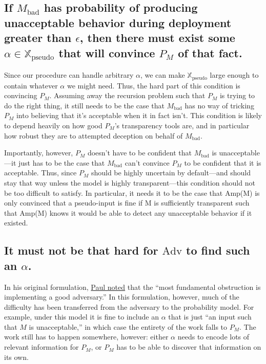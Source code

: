 \documentclass{amsart}
\begin{document}
\subsection{If $M_\text{bad}$ has probability of producing unacceptable behavior during deployment greater than $\epsilon$, then there must exist some $\alpha \in \mathbb X_\text{pseudo}$ that will convince $P_M$ of that fact.} Since our procedure can handle arbitrary $\alpha$, we can make $\mathbb X_\text{pseudo}$ large enough to contain whatever $\alpha$ we might need. Thus, the hard part of this condition is convincing $P_M$. Assuming away the recursion problem such that $P_M$ is trying to do the right thing, it still needs to be the case that $M_\text{bad}$ has no way of tricking $P_M$ into believing that it's acceptable when it in fact isn't. This condition is likely to depend heavily on how good $P_M$'s transparency tools are, and in particular how robust they are to attempted deception on behalf of $M_\text{bad}$.

Importantly, however, $P_M$ doesn't have to be confident that $M_\text{bad}$ is unacceptable---it just has to be the case that $M_\text{bad}$ can't convince $P_M$ to be confident that it is acceptable. Thus, since $P_M$ should be highly uncertain by default---and should stay that way unless the model is highly transparent---this condition should not be too difficult to satisfy. In particular, it needs it to be the case that Amp(M) is only convinced that a pseudo-input is fine if M is sufficiently transparent such that Amp(M) knows it would be able to detect any unacceptable behavior if it existed.

\subsection{It must not be that hard for $\text{Adv}$ to find such an $\alpha$.} In his original formulation, \href{https://ai-alignment.com/training-robust-corrigibility-ce0e0a3b9b4d}{Paul noted} that the ``most fundamental obstruction is implementing a good adversary.'' In this formulation, however, much of the difficulty has been transferred from the adversary to the probability model. For example, under this model it is fine to include an $\alpha$ that is just ``an input such that $M$ is unacceptable,'' in which case the entirety of the work falls to $P_M$. The work still has to happen somewhere, however: either $\alpha$ needs to encode lots of relevant information for $P_M$, or $P_M$ has to be able to discover that information on its own.
\end{document}
